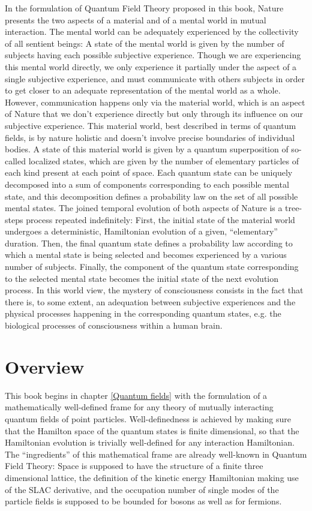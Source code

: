 In the formulation of Quantum Field Theory proposed in this book, Nature presents the two aspects of a material and of a mental world in mutual interaction.
The mental world can be adequately experienced by the collectivity of all sentient beings: A state of the mental world is given by the number of subjects having each possible subjective experience.
Though we are experiencing this mental world directly, we only experience it partially under the aspect of a single subjective experience, and must communicate with others subjects in order to get closer to an adequate representation of the mental world as a whole.
However, communication happens only via the material world, which is an aspect of Nature that we don't experience directly but only through its influence on our subjective experience.
This material world, best described in terms of quantum fields, is by nature holistic and doesn't involve precise boundaries of individual bodies.
A state of this material world is given by a quantum superposition of so-called localized states, which are given by the number of elementary particles of each kind present at each point of space.
Each quantum state can be uniquely decomposed into a sum of components corresponding to each possible mental state, and this decomposition defines a probability law on the set of all possible mental states.
The joined temporal evolution of both aspects of Nature is a tree-steps process repeated indefinitely: First, the initial state of the material world undergoes a deterministic, Hamiltonian evolution of a given, ``elementary'' duration.
Then, the final quantum state defines a probability law according to which a mental state is being selected and becomes experienced by a various number of subjects.
Finally, the component of the quantum state corresponding to the selected mental state becomes the initial state of the next evolution process.
In this world view, the mystery of consciousness consists in the fact that there is, to some extent, an adequation between subjective experiences and the physical processes happening in the corresponding quantum states, e.g. the biological processes of consciousness within a human brain.

\section*{Overview}

This book begins in chapter \ref{Quantum fields} with the formulation of a mathematically well-defined frame for any theory of mutually interacting quantum fields of point particles.
Well-definedness is achieved by making sure that the Hamilton space of the quantum states is finite dimensional, so that the Hamiltonian evolution is trivially well-defined for any interaction Hamiltonian.
The ``ingredients'' of this mathematical frame are already well-known in Quantum Field Theory: Space is supposed to have the structure of a finite three dimensional lattice, the definition of the kinetic energy Hamiltonian making use of the SLAC derivative, and the occupation number of single modes of the particle fields is supposed to be bounded for bosons as well as for fermions.

